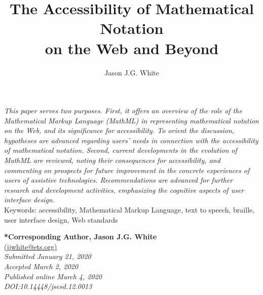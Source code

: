 \documentclass[11.5pt]{sig-alternate} %
\makeatletter
\let\oldabstract\abstract
\let\oldendabstract\endabstract
\renewenvironment{abstract}
{\renewenvironment{quotation}%
               {\list{}{\addtolength{\leftmargin}{1em} %
                        \listparindent 1.5em%
                        \itemindent    \listparindent%
                        \rightmargin   \leftmargin%
                        \parsep        \z@ \@plus\p@}%
                \item\relax}%
               {\endlist}%
\oldabstract}
{\oldendabstract}
\makeatother
\begin{document}
\title{The Accessibility of Mathematical Notation \\ on the Web and Beyond}

\author[1]{\large \color{blue}Jason J.G. White}


\toappear{}
\maketitle
\begin{@twocolumnfalse} 
\begin{abstract}
\item 
\begin{large}
\textit {This paper serves two purposes. First, it offers an overview of the role of the Mathematical Markup Language (MathML) in representing mathematical notation on the Web, and its significance for accessibility. To orient the discussion, hypotheses are advanced regarding users’ needs in connection with the accessibility of mathematical notation. Second, current developments in the evolution of MathML are reviewed, noting their consequences for accessibility, and commenting on prospects for future improvement in the concrete experiences of users of assistive technologies. Recommendations are advanced for further research and development activities, emphasizing the cognitive aspects of user interface design.} \\

Keywords: accessibility, Mathematical Markup Language, text to speech, braille, user interface design, Web standards

\end{large}
\end{abstract}
\end{@twocolumnfalse}


\textbf{*Corresponding Author, Jason J.G. White} \\
\href{mailto: jjwhite@ets.org }{(jjwhite@ets.org)} \\
\textit{Submitted  January 21, 2020}\\
\textit{Accepted March 2, 2020} \\
\textit{Published online March 4, 2020} \\
\textit{DOI:10.14448/jsesd.12.0013} \\
\pagebreak
\clearpage
\end{document}
